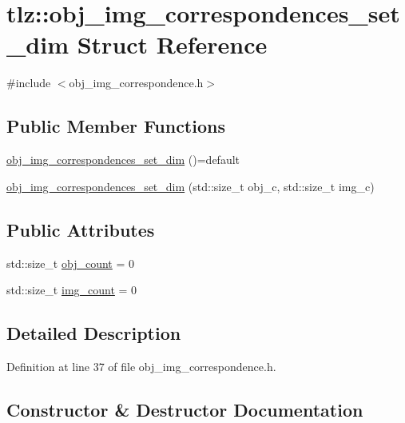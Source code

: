 \hypertarget{structtlz_1_1obj__img__correspondences__set__dim}{}\section{tlz\+:\+:obj\+\_\+img\+\_\+correspondences\+\_\+set\+\_\+dim Struct Reference}
\label{structtlz_1_1obj__img__correspondences__set__dim}


{\ttfamily \#include $<$obj\+\_\+img\+\_\+correspondence.\+h$>$}

\subsection*{Public Member Functions}
\begin{DoxyCompactItemize}
\item 
\hyperlink{structtlz_1_1obj__img__correspondences__set__dim_af439c3af04e128d5e10f2102ad77c603}{obj\+\_\+img\+\_\+correspondences\+\_\+set\+\_\+dim} ()=default
\item 
\hyperlink{structtlz_1_1obj__img__correspondences__set__dim_a6ce99ad1fbe0f7cb0518b04e6f033b36}{obj\+\_\+img\+\_\+correspondences\+\_\+set\+\_\+dim} (std\+::size\+\_\+t obj\+\_\+c, std\+::size\+\_\+t img\+\_\+c)
\end{DoxyCompactItemize}
\subsection*{Public Attributes}
\begin{DoxyCompactItemize}
\item 
std\+::size\+\_\+t \hyperlink{structtlz_1_1obj__img__correspondences__set__dim_a0e47d36ada0e0e1549aab4fc6664fff1}{obj\+\_\+count} = 0
\item 
std\+::size\+\_\+t \hyperlink{structtlz_1_1obj__img__correspondences__set__dim_a5e8384f9da8f1f249b71314924b19920}{img\+\_\+count} = 0
\end{DoxyCompactItemize}


\subsection{Detailed Description}


Definition at line 37 of file obj\+\_\+img\+\_\+correspondence.\+h.



\subsection{Constructor \& Destructor Documentation}
